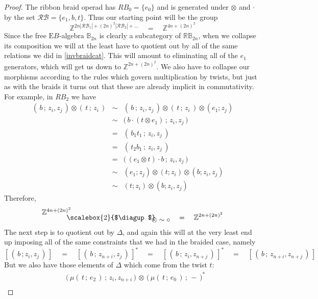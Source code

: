 \documentclass{amsbook} %
\newcommand{\bigquotient}[2]{ \raisebox{0.75\height}{$#1$} \mkern-12mu\scalebox{2}{$\diagup$}\mkern-10mu \raisebox{-0.5\height}{$#2$} }
\numberwithin{section}{chapter}
\begin{document}
\begin{proof}
The ribbon braid operad has $RB_0 = \{e_0\}$ and is generated under $\otimes$ and $\cdot$ by the set $\mathcal{RB} = \{ e_1, b, t \}$. Thus our starting point will be the group
\[ \mathbb{Z}^{2n|\mathcal{RB}_1| + (2n)^2|\mathcal{RB}_2| + \ldots} \quad = \quad \mathbb{Z}^{4n + (2n)^2} \]
Since the free $\mathrm{E}B$-algebra $\mathbb{B}_{2n}$ is clearly a subcategory of $\mathbb{RB}_{2n}$, when we collapse its composition we will at the least have to quotient out by all of the same relations we did in \cref{invbraidcat}. This will amount to eliminating all of the $e_1$ generators, which will get us down to $\mathbb{Z}^{2n + (2n)^2}$. We also have to collapse our morphisms according to the rules which govern multiplication by twists, but just as with the braids it turns out that these are already implicit in commutativity. For example, in $RB_2$ we have
\[ \begin{array}{rrl}
			 ( \, b \, ; \, z_i, z_j \, ) \otimes ( \, t \, ; \, z_i \,) & \sim & ( \, b \, ; \, z_i, z_j \, ) \otimes ( \, t \, ; \, z_i \,) \otimes (e_1; z_j) \\
			& \sim & \big( \, b \cdot (t \otimes e_1) \, ; \, z_i, z_j \, \big) \\	
			& = & ( \, b_1 t_1 \, ; \, z_i, z_j \,) \\
			& = & ( \, t_2 b_1 \, ; \, z_i, z_j \,) \\
			& = & \big( \, (e_1 \otimes t) \cdot b \, ; \, z_i, z_j \, \big) \\
			& \sim & (e_1; z_j) \otimes ( t ; z_i ) \otimes ( b; z_i, z_j ) \\
			& \sim & ( t ;z_i ) \otimes ( b ; z_i, z_j)
		\end{array}
\]
Therefore,
\[ \bigquotient{\mathbb{Z}^{4n + (2n)^2}}{\otimes \sim \circ} \quad = \quad \mathbb{Z}^{2n + (2n)^2} \]
The next step is to quotient out by $\Delta$, and again this will at the very least end up imposing all of the same constraints that we had in the braided case, namely
\[ [ \, ( \, b \, ; z_i, z_j \, ) \, ] \quad = \quad [ \, ( \, b \, ; \, z_{n+i}, z_j \, ) \, ]^* \quad = \quad [ \, ( \, b \, ; \, z_i, z_{n+j} \, ) \, ]^* \quad = \quad [ \, ( \, b \, ; \, z_{n+i}, z_{n+j} \, ) \, ]  \]
But we also have those elements of $\Delta$ which come from the twist $t$:
\[ \begin{array}{rl}
			& \big( \, \mu( \, t \, ; \, e_2 \, ) \, ; \, z_i, z_{n+i} \, \big) \, \otimes \, \big( \,  \mu( \, t \, ; \, e_0 \, ) \, ; \, - \, \big)^* \\

\end{array}\]
\end{proof}
\end{document}
